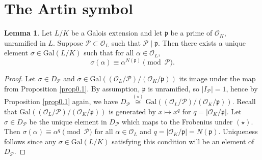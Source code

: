\documentclass{article}
\theoremstyle{definition}
\newtheorem{lemma}[theorem]{Lemma}
\begin{document}
\section{The Artin symbol}
\begin{lemma}
    Let $L/K$ be a Galois extension and let $\mathfrak{p}$ be a prime of $\mathcal{O}_K$, unramified in $L$. Suppose $\mathcal{P} \subset  \mathcal{O}_L$ such that $\mathcal{P} \mid  \mathfrak{p}$. Then there exists a unique element $\sigma \in \text{Gal}(L/K)$ such that for all $\alpha \in \mathcal{O}_L$,\[
    \sigma(\alpha) \equiv \alpha^{N(\mathfrak{p})} \pmod{\mathcal{P}}.
    \]
\end{lemma}
\begin{proof}
    Let $\sigma \in D_{\mathcal{P}}$ and $\overline{\sigma} \in \text{Gal}((\mathcal{O}_L/\mathcal{P})/ (\mathcal{O}_K/\mathfrak{p}))$ its image under the map from Proposition \ref{prop0.1}. By assumption, $\mathfrak{p}$ is unramified, so $|I_{\mathcal{P}}| = 1$, hence by Proposition \ref{prop0.1} again, we have $D_{\mathcal{P}} \stackrel{(\star)}{\cong}  \text{Gal}((\mathcal{O}_L/\mathcal{P})/ (\mathcal{O}_K/\mathfrak{p}))$. Recall that $\text{Gal}((\mathcal{O}_L/\mathcal{P})/ (\mathcal{O}_K/\mathfrak{p}))$ is generated by $x \mapsto x^q$ for $q = |\mathcal{O}_K/\mathfrak{p}|$. Let $\sigma \in D_{\mathcal{P}}$ be the unique element in $D_{\mathcal{P}}$ which maps to the Frobenius under $(\star)$. Then $\sigma(\alpha) \equiv \alpha^q \pmod{\mathcal{P}}$ for all $\alpha \in \mathcal{O}_L$ and $q = |\mathcal{O}_K/\mathfrak{p}| = N(\mathfrak{p})$. Uniqueness follows since any $\sigma \in \text{Gal}(L/K)$ satisfying this condition will be an element of $D_{\mathcal{P}}$.
\end{proof}
\end{document}
